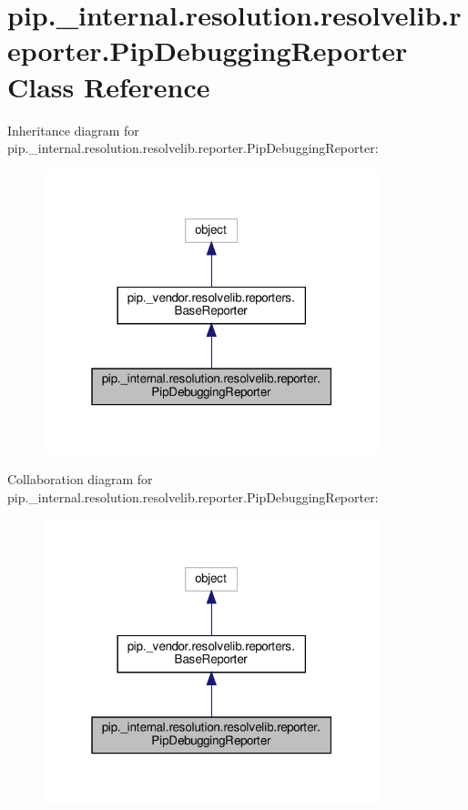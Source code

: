 \hypertarget{classpip_1_1__internal_1_1resolution_1_1resolvelib_1_1reporter_1_1PipDebuggingReporter}{}\section{pip.\+\_\+internal.\+resolution.\+resolvelib.\+reporter.\+Pip\+Debugging\+Reporter Class Reference}
\label{classpip_1_1__internal_1_1resolution_1_1resolvelib_1_1reporter_1_1PipDebuggingReporter}


Inheritance diagram for pip.\+\_\+internal.\+resolution.\+resolvelib.\+reporter.\+Pip\+Debugging\+Reporter\+:
\nopagebreak
\begin{figure}[H]
\begin{center}
\leavevmode
\includegraphics[width=277pt]{classpip_1_1__internal_1_1resolution_1_1resolvelib_1_1reporter_1_1PipDebuggingReporter__inherit__graph}
\end{center}
\end{figure}


Collaboration diagram for pip.\+\_\+internal.\+resolution.\+resolvelib.\+reporter.\+Pip\+Debugging\+Reporter\+:
\nopagebreak
\begin{figure}[H]
\begin{center}
\leavevmode
\includegraphics[width=277pt]{classpip_1_1__internal_1_1resolution_1_1resolvelib_1_1reporter_1_1PipDebuggingReporter__coll__graph}
\end{center}
\end{figure}
